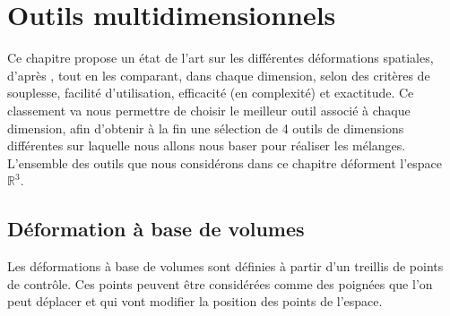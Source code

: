 
\chapter{Outils multidimensionnels}

\graphicspath{{Chapter1/Chapter1Figs/PNG/}{Chapter1/Chapter1Figs/PDF/}{Chapter1/Chapter1Figs/}}

Ce chapitre propose un état de l'art sur les différentes déformations
spatiales, d'après \cite{GB08}, tout en les comparant, dans chaque
dimension, selon des critères de souplesse, facilité d'utilisation,
efficacité (en complexité) et exactitude. Ce classement va nous
permettre de choisir le meilleur outil associé à chaque dimension,
afin d'obtenir à la fin une sélection de 4 outils de dimensions
différentes sur laquelle nous allons nous baser pour réaliser les
mélanges. L'ensemble des outils que nous considérons dans ce chapitre
déforment l'espace $\mathbb{R}^3$.

\section{Déformation à base de volumes}
Les déformations à base de volumes sont définies à partir d'un
treillis de points de contrôle. Ces points peuvent être considérées
comme des poignées que l'on peut déplacer et qui vont modifier la
position des points de l'espace.

